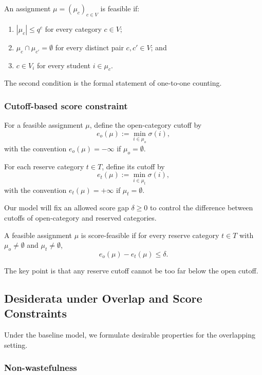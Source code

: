 \documentclass[runningheads]{llncs}
\newcommand{\1}{\mathbf{1}}
\begin{document}
\begin{definition}[Feasibility]
An assignment $\mu=(\mu_c)_{c\in V}$ is feasible if:
\begin{enumerate}
\item $|\mu_c|\le q^c$ for every category $c\in V$;
\item $\mu_c\cap \mu_{c'}=\emptyset$ for every distinct pair $c,c'\in V$; and
\item $c\in V_i$ for every student $i\in \mu_c$.
\end{enumerate}
\end{definition}

The second condition is the formal statement of one-to-one counting.

\subsubsection{Cutoff-based score constraint}

For a feasible assignment $\mu$, define the open-category cutoff by
\[
e_o(\mu):=\min_{i\in\mu_o}\sigma(i),
\]
with the convention $e_o(\mu)=-\infty$ if $\mu_o=\emptyset$.

For each reserve category $t\in T$, define its cutoff by
\[
e_t(\mu):=\min_{i\in\mu_t}\sigma(i),
\]
with the convention $e_t(\mu)=+\infty$ if $\mu_t=\emptyset$.

Our model will fix an allowed score gap $\delta\ge 0$ to control the difference between cutoffs of open-category and reserved categories.

\begin{definition}
A feasible assignment $\mu$ is score-feasible if for every reserve category $t\in T$ with $\mu_o\neq\emptyset$ and $\mu_t\neq\emptyset$,
\[
e_o(\mu)-e_t(\mu)\le \delta.
\]
\end{definition}

The key point is that any reserve cutoff cannot be too far below the open cutoff.

\subsection{Desiderata under Overlap and Score Constraints}

Under the baseline model, we formulate desirable properties for the overlapping setting.

\subsubsection{Non-wastefulness}
\end{document}
